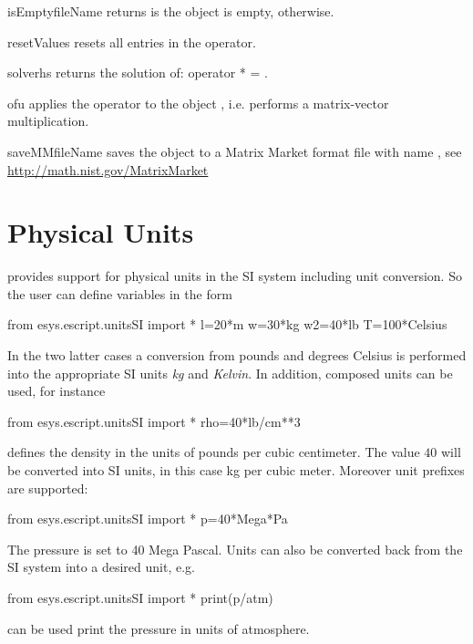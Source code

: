\begin{methoddesc}[Operator]{isEmpty}{fileName}
returns \True is the object is empty, \False otherwise.
\end{methoddesc}

\begin{methoddesc}[Operator]{resetValues}{}
resets all entries in the operator.
\end{methoddesc}

\begin{methoddesc}[Operator]{solve}{rhs}
    returns the solution  of: operator *  = .
\end{methoddesc}

\begin{methoddesc}[Operator]{of}{u}
applies the operator to the \Data object , i.e. performs a matrix-vector
multiplication.
\end{methoddesc}

\begin{methoddesc}[Operator]{saveMM}{fileName}
saves the object to a Matrix Market format file with name , see
\url{http://math.nist.gov/MatrixMarket}
\end{methoddesc}

\section{Physical Units}
\escript provides support for physical units in the SI system
including unit conversion. So the user can define variables in the form
\begin{python}
  from esys.escript.unitsSI import *
  l=20*m
  w=30*kg
  w2=40*lb
  T=100*Celsius
\end{python}
In the two latter cases a conversion from pounds and degrees
Celsius is performed into the appropriate SI units \emph{kg}
and \emph{Kelvin}.
In addition, composed units can be used, for instance
\begin{python}
  from esys.escript.unitsSI import *
  rho=40*lb/cm**3
\end{python}
defines the density in the units of pounds per cubic centimeter.
The value $40$ will be converted into SI units, in this case kg per cubic
meter. Moreover unit prefixes are supported:
\begin{python}
  from esys.escript.unitsSI import *
  p=40*Mega*Pa
\end{python}
The pressure  is set to 40 Mega Pascal. Units can also be converted
back from the SI system into a desired unit, e.g.
\begin{python}
  from esys.escript.unitsSI import *
  print(p/atm)
\end{python}
can be used print the pressure in units of atmosphere.

